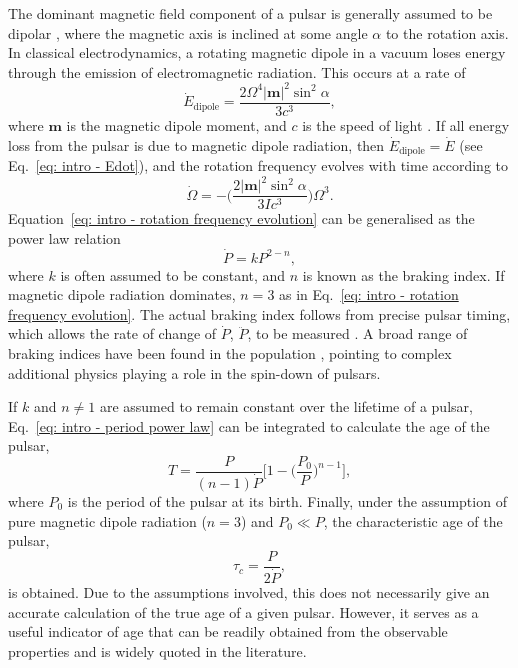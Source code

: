 The dominant magnetic field component of a pulsar is generally assumed to be dipolar \citep[][]{Pxxx1968}, where the magnetic axis is inclined at some angle $\alpha$ to the rotation axis. In classical electrodynamics, a rotating magnetic dipole in a vacuum loses energy through the emission of electromagnetic radiation. This occurs at a rate of 
\begin{equation}
    \label{eq: intro - dipole Edot}
    \dot{E}_\mathrm{dipole} = \frac{2\Omega^4|\mathbf{m}|^2\sin^2\alpha}{3c^3},
\end{equation}
where $\mathbf{m}$ is the magnetic dipole moment, and $c$ is the speed of light \citep[see for example][]{Jxxx1962}. If all energy loss from the pulsar is due to magnetic dipole radiation, then $\dot{E}_\mathrm{dipole} = \dot{E}$ (see Eq.~\eqref{eq: intro - Edot}), and the rotation frequency evolves with time according to
\begin{equation}
    \label{eq: intro - rotation frequency evolution}
    \dot{\Omega} = -\bigg( \frac{2|\mathbf{m}|^2\sin^2\alpha}{3Ic^3}\bigg)\Omega^3.
\end{equation} 
Equation~\eqref{eq: intro - rotation frequency evolution} can be generalised as the power law relation
\begin{equation}
    \label{eq: intro - period power law}
    \dot{P} = kP^{2-n},
\end{equation}
where $k$ is often assumed to be constant, and $n$ is known as the braking index. If magnetic dipole radiation dominates, $n=3$ as in Eq.~\eqref{eq: intro - rotation frequency evolution}. The actual braking index follows from precise pulsar timing, which allows the rate of change of $\dot{P}$, $\ddot{P}$, to be measured \citep[e.g.][]{Lxxx2020}. A broad range of braking indices have been found in the population \citep[e.g.][]{HLK+2004,HLKx2010}, pointing to complex additional physics playing a role in the spin-down of pulsars.

If $k$ and $n\neq 1$ are assumed to remain constant over the lifetime of a pulsar, Eq.~\eqref{eq: intro - period power law} can be integrated to calculate the age of the pulsar,
\begin{equation}
    \label{eq: intro - pulsar age}
    T = \frac{P}{(n-1)\dot{P}}\bigg[ 1 - \bigg(\frac{P_0}{P}\bigg)^{n-1} \bigg],
\end{equation}
where $P_0$ is the period of the pulsar at its birth. Finally, under the assumption of pure magnetic dipole radiation ($n=3$) and $P_0 \ll P$, the characteristic age of the pulsar,
\begin{equation}
    \label{eq: intro - characteristic age}
    \tau_c = \frac{P}{2\dot{P}},
\end{equation}
is obtained. Due to the assumptions involved, this does not necessarily give an accurate calculation of the true age of a given pulsar. However, it serves as a useful indicator of age that can be readily obtained from the observable properties and is widely quoted in the literature.



